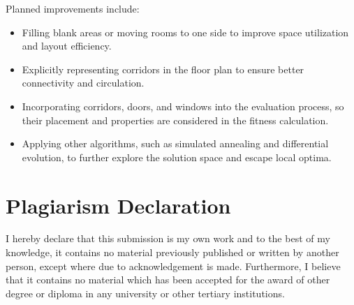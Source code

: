 \documentclass[]{article}
\begin{document}
Planned improvements include:
\begin{itemize}
    \item Filling blank areas or moving rooms to one side to improve space utilization and layout efficiency.
    \item Explicitly representing corridors in the floor plan to ensure better connectivity and circulation.
    \item Incorporating corridors, doors, and windows into the evaluation process, so their placement and properties are considered in the fitness calculation.
    \item Applying other algorithms, such as simulated annealing and differential evolution, to further explore the solution space and escape local optima.
\end{itemize}


\section{Plagiarism Declaration}
I hereby declare that this submission is my own work and to the best of my knowledge, it contains no material previously published or written by another person, except where due to acknowledgement is made. Furthermore, I believe that it contains no material which has been accepted for the award of other degree or diploma in any university or other tertiary institutions.

\newpage


\end{document}
